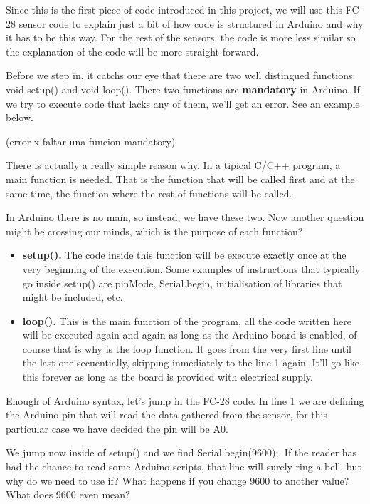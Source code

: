Since this is the first piece of code introduced in this project, we will use this FC-28 sensor code to explain just a bit of how code is structured in Arduino and why it has to be this way. For the rest of the sensors, the code is more less similar so the explanation of the code will be more straight-forward.

Before we step in, it catchs our eye that there are two well distingued functions: void setup() and void loop(). There two functions are \textbf{mandatory} in Arduino. If we try to execute code that lacks any of them, we'll get an error. See an example below.

(error x faltar una funcion mandatory)

There is actually a really simple reason why. In a tipical C/C++ program, a main function is needed. That is the function that will be called first and at the same time, the function where the rest of functions will be called.

In Arduino there is no main, so instead, we have these two. Now another question might be crossing our minds, which is the purpose of each function?

\begin{itemize}
	\item \textbf{setup().} The code inside this function will be execute exactly once at the very beginning of the execution. Some examples of instructions that typically go inside setup() are pinMode, Serial.begin, initialisation of libraries that might be included, etc.
	\item \textbf{loop().} This is the main function of the program, all the code written here will be executed again and again as long as the Arduino board is enabled, of course that is why is the loop function. It goes from the very first line until the last one secuentially, skipping inmediately to the line 1 again. It'll go like this forever as long as the board is provided with electrical supply.
\end{itemize}

Enough of Arduino syntax, let's jump in the FC-28 code. In line 1 we are defining the Arduino pin that will read the data gathered from the sensor, for this particular case we have decided the pin will be A0.

We jump now inside of setup() and we find Serial.begin(9600);. If the reader has had the chance to read some Arduino scripts, that line will surely ring a bell, but why do we need to use if? What happens if you change 9600 to another value? What does 9600 even mean?

